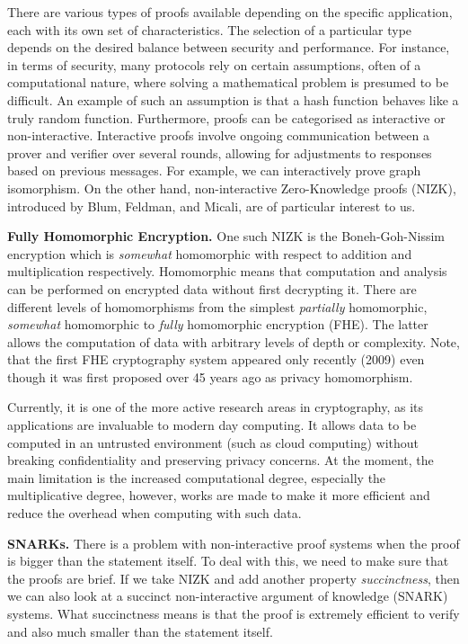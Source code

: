 \documentclass{Resources/UoBLab1}
\theoremstyle{definition}
\begin{document}
There are various types of proofs available depending on the specific application, each with its own set of characteristics. The selection of a particular type depends on the desired balance between security and performance. For instance, in terms of security, many protocols rely on certain assumptions, often of a computational nature, where solving a mathematical problem is presumed to be difficult. An example of such an assumption is that a hash function behaves like a truly random function\cite{RNGZK}. Furthermore, proofs can be categorised as interactive or non-interactive. Interactive proofs involve ongoing communication between a prover and verifier over several rounds, allowing for adjustments to responses based on previous messages. For example, we can interactively prove graph isomorphism\cite{ZKProofSystemsBook}. On the other hand, non-interactive Zero-Knowledge proofs (NIZK), introduced by Blum, Feldman, and Micali, are of particular interest to us.\medskip

\noindent\textbf{Fully Homomorphic Encryption.} One such NIZK is the Boneh-Goh-Nissim\cite{BGNCipher} encryption which is \textit{somewhat} homomorphic with respect to addition and multiplication respectively. Homomorphic means that computation and analysis can be performed on encrypted data without first decrypting it. There are different levels of homomorphisms from the simplest \textit{partially} homomorphic, \textit{somewhat} homomorphic to \textit{fully} homomorphic encryption (FHE). The latter allows the computation of data with arbitrary levels of depth or complexity\cite{FHEPHD}. Note, that the first FHE cryptography system appeared only recently (2009\cite{FHEPHD}) even though it was first proposed over 45 years ago\cite{FHEMention} as privacy homomorphism.

Currently, it is one of the more active research areas in cryptography, as its applications are invaluable to modern day computing. It allows data to be computed in an untrusted environment (such as cloud computing) without breaking confidentiality and preserving privacy concerns. At the moment, the main limitation is the increased computational degree, especially the multiplicative degree, however, works are made to make it more efficient and reduce the overhead when computing with such data\cite{FHEImprovement1}\cite{FHEImprovement2}.\medskip

\noindent\textbf{SNARKs.} There is a problem with non-interactive proof systems when the proof is bigger than the statement itself. To deal with this, we need to make sure that the proofs are brief. If we take NIZK and add another property \textit{succinctness}, then we can also look at a succinct non-interactive argument of knowledge (SNARK) systems. What succinctness means is that the proof is extremely efficient to verify and also much smaller than the statement itself.
\end{document}
